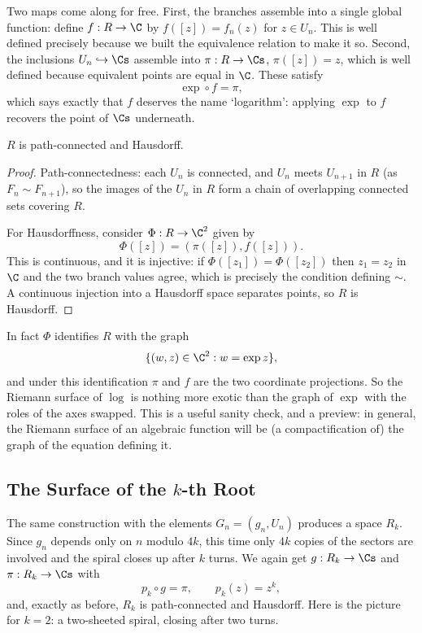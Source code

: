 Two maps come along for free. First, the branches assemble into a single global function:
define $f : R \to \C$ by $f([z]) = f_n(z)$ for $z \in U_n$. This is well defined precisely
because we built the equivalence relation to make it so. Second, the inclusions
$U_n \hookrightarrow \Cs$ assemble into $\pi : R \to \Cs$, $\pi([z]) = z$, which is well
defined because equivalent points are equal in $\C$. These satisfy
$$
\exp \circ f = \pi,
$$
which says exactly that $f$ deserves the name `logarithm': applying $\exp$ to $f$ recovers
the point of $\Cs$ underneath.

\begin{proposition}
	$R$ is path-connected and Hausdorff.
\end{proposition}

\begin{proof}
	Path-connectedness: each $U_n$ is connected, and $U_n$ meets $U_{n+1}$ in $R$ (as
	$F_n \sim F_{n+1}$), so the images of the $U_n$ in $R$ form a chain of overlapping
	connected sets covering $R$.

	For Hausdorffness, consider $\Phi : R \to \C^2$ given by
	$$
	\Phi([z]) = (\pi([z]), f([z])).
	$$
	This is continuous, and it is injective: if $\Phi([z_1]) = \Phi([z_2])$ then $z_1 = z_2$
	in $\C$ and the two branch values agree, which is precisely the condition defining
	$\sim$. A continuous injection into a Hausdorff space separates points, so $R$ is
	Hausdorff.
\end{proof}

\begin{remark}
	In fact $\Phi$ identifies $R$ with the graph
	$$
	\{(w, z) \in \C^2 : w = \exp z\},
	$$
	and under this identification $\pi$ and $f$ are the two coordinate projections. So the
	Riemann surface of $\log$ is nothing more exotic than the graph of $\exp$ with the
	roles of the axes swapped. This is a useful sanity check, and a preview: in general,
	the Riemann surface of an algebraic function will be (a compactification of) the graph
	of the equation defining it.
\end{remark}

\subsection{The Surface of the $k$-th Root}

The same construction with the elements $G_n = (g_n, U_n)$ produces a space $R_k$. Since
$g_n$ depends only on $n$ modulo $4k$, this time only $4k$ copies of the sectors are
involved and the spiral closes up after $k$ turns. We again get $g : R_k \to \Cs$ and
$\pi : R_k \to \Cs$ with
$$
p_k \circ g = \pi, \qquad p_k(z) = z^k,
$$
and, exactly as before, $R_k$ is path-connected and Hausdorff. Here is the picture for
$k = 2$: a two-sheeted spiral, closing after two turns.

